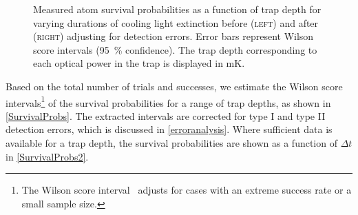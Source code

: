 \documentclass[../Thesis-IJspeert.tex]{subfiles}
\begin{document}
\begin{figure}[!t]
\begin{tikzpicture}
	\end{tikzpicture}
	\caption[Measured atom survival probabilities as a function of trap depth for varying durations of cooling light extinction]{Measured atom survival probabilities as a function of trap depth for varying durations of cooling light extinction before \textsc{(left)} and after \textsc{(right)} adjusting for detection errors. Error bars represent Wilson score intervals (\SI{95}{\percent} confidence). The trap depth corresponding to each optical power in the trap is displayed in \si{\milli\kelvin}.} %
	\label{SurvivalProbs} 
\end{figure}
Based on the total number of trials and successes, we estimate the Wilson score intervals\footnote{The Wilson score interval~\cite{wilson1927} adjusts for cases with an extreme success rate or a small sample size.} of the survival probabilities for a range of trap depths, as shown in \autoref{SurvivalProbs}. The extracted intervals are corrected for type I and type II detection errors, which is discussed in \autoref{erroranalysis}. Where sufficient data is available for a trap depth, the survival probabilities are shown as a function of $\Delta t$ in \autoref{SurvivalProbs2}.
\end{document}
